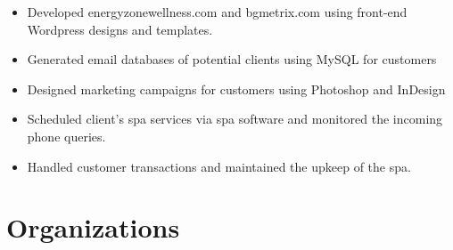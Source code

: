 \documentclass[12pt,letterpaper,sans]{moderncv}        %
\begin{document}
{\begin{itemize}%
\item Developed energyzonewellness.com and bgmetrix.com using front-end Wordpress designs and templates.
\item Generated email databases of potential clients using MySQL for customers
\item Designed marketing campaigns for customers using Photoshop and InDesign
\end{itemize}
  }
{\begin{itemize}%
\item Scheduled client’s spa services via spa software and monitored the incoming phone queries.
\item Handled customer transactions and maintained the upkeep of the spa.
\end{itemize} }

\section{Organizations}


\nocite{*}



\end{document}
